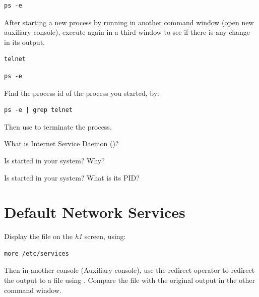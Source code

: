\documentclass{../UTNetLab}
\begin{document}
\begin{lstlisting}
ps -e
\end{lstlisting}

After starting a new process by running  in another command window (open new auxiliary console), execute  again in a third window to see if there is any change in its output.

\begin{lstlisting}
telnet
\end{lstlisting}

\begin{lstlisting}
ps -e
\end{lstlisting}

Find the process id of the  process you started, by:

\begin{lstlisting}
ps -e | grep telnet
\end{lstlisting}
Then use  to terminate the  process.

\begin{report}
    \item What is Internet Service Daemon ()?

    \item Is  started in your system? Why?

    \item Is  started in your system? What is its PID?
\end{report}

\section{Default Network Services}
Display the file  on the \textit{h1} screen, using:

\begin{lstlisting}
more /etc/services
\end{lstlisting}

Then in another console (Auxiliary console), use the redirect operator to redirect the  output to
a file using .
Compare the file  with the original  output in the other command window.
\end{document}
